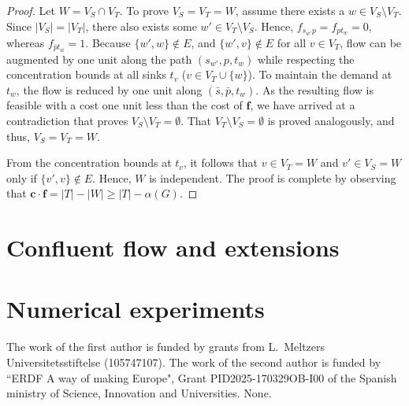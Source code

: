 \documentclass[pdflatex,sn-mathphys-num]{sn-jnl}%
\theoremstyle{thmstyleone}%
\begin{document}
\begin{proof}
Let $W=V_S\cap V_T$.
To prove $V_S=V_T=W$, assume there exists a $w\in V_S\setminus V_T$.
Since $|V_S|=|V_T|$, there also exists some $w'\in V_T\setminus V_S$.
Hence, $f_{s_{w'}p}=f_{pt_w}=0$, whereas $f_{\bar{p}t_w}=1$.
Because $\{w',w\}\notin E$, and $\{w',v\}\notin E$ for all $v\in V_T$,
flow can be augmented by one unit along the path $(s_{w'},p,t_w)$ while respecting the concentration bounds
at all sinks $t_v$ ($v\in V_T\cup\{w\}$).
To maintain the demand at $t_w$, the flow is reduced by one unit along $(\bar{s},\bar{p},t_w)$.
As the resulting flow is feasible with a cost one unit less than the cost of $\boldsymbol{f}$,
we have arrived at a contradiction that proves $V_S\setminus V_T=\emptyset$.
That $V_T\setminus V_S=\emptyset$ is proved analogously, and thus, $V_S=V_T=W$.

From the concentration bounds at $t_v$, it follows that $v\in V_T=W$ and $v'\in V_S=W$ only if $\{v',v\}\notin E$.
Hence, $W$ is independent.
The proof is complete by observing that $\boldsymbol{c}\cdot\boldsymbol{f} = |T|-|W|\geq|T|-\alpha(G)$.
\end{proof}

\section{Confluent flow and extensions} \label{sec:conf}
\section{Numerical experiments} \label{sec:exp}

\backmatter
{}
\small{The work of the first author is funded by grants from L.\ Meltzers Universitetsstiftelse (105747107).}
\small{The work of the second author is funded by “ERDF A way of making Europe", Grant PID2025-170329OB-I00 of the Spanish ministry of Science, Innovation and Universities.}
\small{None.}

% 

\end{document}
